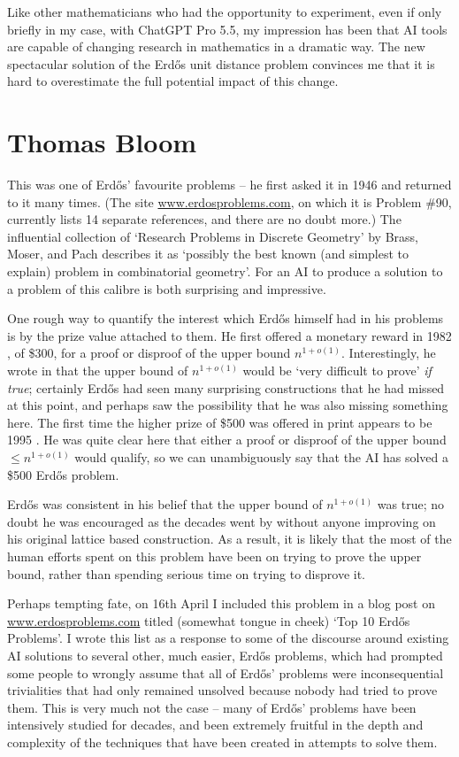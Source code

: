 \documentclass[11pt,reqno]{amsart}
\numberwithin{equation}{section}
\theoremstyle{definition}
\theoremstyle{remark}
\begin{document}
Like other mathematicians who had the opportunity to  
experiment, even if only briefly in my case, with ChatGPT Pro 5.5, 
my impression has been that AI tools 
are capable of changing research in mathematics in a dramatic way.
The new spectacular solution of the Erd\H{o}s unit distance problem 
convinces me that it is hard to
overestimate the full potential impact of this change.


\section{Thomas Bloom}

This was one of Erd\H{o}s' favourite problems -- he first asked it in 1946 \cite{Erdos1946SetsDistances} and returned to it many times. (The site \url{www.erdosproblems.com}, on which it is Problem \#90, currently lists 14 separate references, and there are no doubt more.) The influential collection of `Research Problems in Discrete Geometry' by Brass, Moser, and Pach \cite{BMP} describes it as `possibly the best known (and simplest to explain) problem in combinatorial geometry'. For an AI to produce a solution to a problem of this calibre is both surprising and impressive.

One rough way to quantify the interest which Erd\H{o}s himself had in his problems is by the prize value attached to them. He first offered a monetary reward in 1982 \cite{Er82e}, of \$300, for a proof or disproof of the upper bound $n^{1+o(1)}$. Interestingly, he wrote in \cite{Er90} that the upper bound of $n^{1+o(1)}$ would be `very difficult to prove' \emph{if true}; certainly Erd\H{o}s had seen many surprising constructions that he had missed at this point, and perhaps saw the possibility that he was also missing something here. The first time the higher prize of \$500 was offered in print appears to be 1995 \cite{Er95}. He was quite clear here that either a proof or disproof of the upper bound $\leq n^{1+o(1)}$ would qualify, so we can unambiguously say that the AI has solved a \$500 Erd\H{o}s problem.

Erd\H{o}s was consistent in his belief that the upper bound of $n^{1+o(1)}$ was true; no doubt he was encouraged as the decades went by without anyone improving on his original lattice based construction. As a result, it is likely that the most of the human efforts spent on this problem have been on trying to prove the upper bound, rather than spending serious time on trying to disprove it.

Perhaps tempting fate, on 16th April I included this problem in a blog post on \url{www.erdosproblems.com} titled (somewhat tongue in cheek) `Top 10 Erd\H{o}s Problems'. I wrote this list as a response to some of the discourse around existing AI solutions to several other, much easier, Erd\H{o}s problems, which had prompted some people to wrongly assume that all of Erd\H{o}s' problems were inconsequential trivialities that had only remained unsolved because nobody had tried to prove them. This is very much not the case -- many of Erd\H{o}s' problems have been intensively studied for decades, and been extremely fruitful in the depth and complexity of the techniques that have been created in attempts to solve them.
\end{document}
